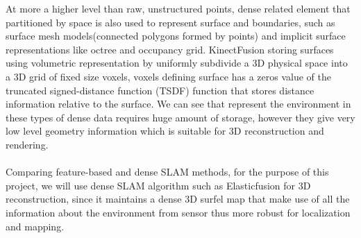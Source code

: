 \documentclass[12pt,twoside]{article}
\begin{document}
At more a higher level than raw, unstructured points, dense related element that partitioned by space is also used to represent surface and boundaries, such as surface mesh models(connected polygons formed by points) and implicit surface representations like octree and occupancy grid. KinectFusion\citep{newcombe2011kinectfusion} storing surfaces using volumetric representation by uniformly subdivide a 3D physical space into a 3D grid of fixed size voxels, voxels defining surface has a zeros value of the truncated
signed-distance function (TSDF) function that stores distance information relative to the surface. We can see that represent the environment in these types of dense data requires huge amount of storage, however they give very low level geometry information which is suitable for 3D reconstruction and rendering.\\
\\
Comparing feature-based and dense SLAM methods, for the purpose of this project, we will use dense SLAM algorithm such as Elasticfusion\citep{whelan2015elasticfusion} for 3D reconstruction, since it maintains a dense 3D surfel map that make use of all the information about the environment from sensor thus more robust for localization and mapping.\\
\end{document}
